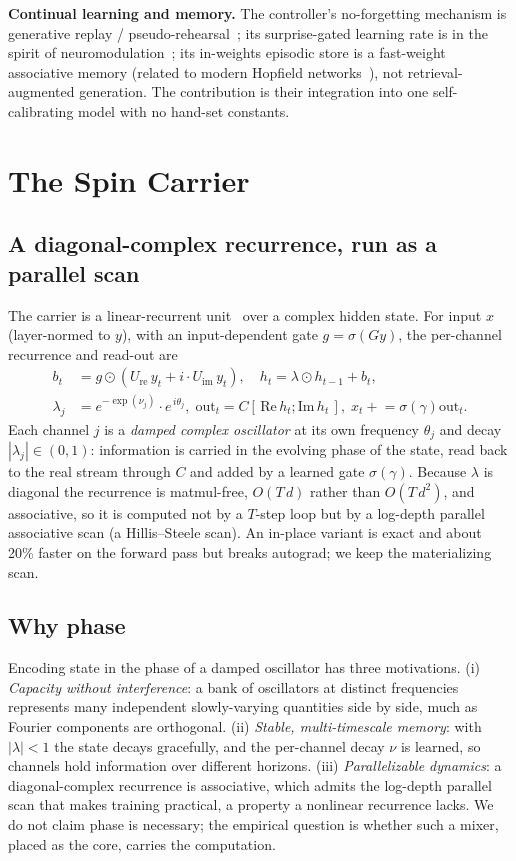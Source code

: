 \documentclass[journal]{IEEEtran}
\begin{document}
\textbf{Continual learning and memory.} The controller's no-forgetting mechanism is generative replay / pseudo-rehearsal~\cite{robins1995}; its surprise-gated learning rate is in the spirit of neuromodulation~\cite{doya2002}; its in-weights episodic store is a fast-weight associative memory (related to modern Hopfield networks~\cite{ramsauer2021}), not retrieval-augmented generation. The contribution is their integration into one self-calibrating model with no hand-set constants.

\section{The Spin Carrier}
\label{sec:carrier}
\subsection{A diagonal-complex recurrence, run as a parallel scan}
The carrier is a linear-recurrent unit~\cite{gu2022s4} over a complex hidden state. For input $x$ (layer-normed to $y$), with an input-dependent gate $g=\sigma(G y)$, the per-channel recurrence and read-out are
\begin{align}
b_t &= g \odot (U_{\mathrm{re}}\, y_t + i \cdot U_{\mathrm{im}}\, y_t), \quad h_t = \lambda \odot h_{t-1} + b_t, \\
\lambda_j &= e^{-\exp(\nu_j)} \cdot e^{\,i\theta_j}, \; \mathrm{out}_t = C[\,\mathrm{Re}\, h_t ; \mathrm{Im}\, h_t\,], \; x_t \mathrel{+}= \sigma(\gamma) \mathrm{out}_t. \nonumber
\end{align}
Each channel $j$ is a \emph{damped complex oscillator} at its own frequency $\theta_j$ and decay $|\lambda_j|\in(0,1)$: information is carried in the evolving phase of the state, read back to the real stream through $C$ and added by a learned gate $\sigma(\gamma)$. Because $\lambda$ is diagonal the recurrence is matmul-free, $O(T\,d)$ rather than $O(T\,d^2)$, and associative, so it is computed not by a $T$-step loop but by a log-depth parallel associative scan (a Hillis--Steele scan). An in-place variant is exact and about 20\% faster on the forward pass but breaks autograd; we keep the materializing scan.

\subsection{Why phase}
Encoding state in the phase of a damped oscillator has three motivations. (i) \emph{Capacity without interference}: a bank of oscillators at distinct frequencies represents many independent slowly-varying quantities side by side, much as Fourier components are orthogonal. (ii) \emph{Stable, multi-timescale memory}: with $|\lambda|<1$ the state decays gracefully, and the per-channel decay $\nu$ is learned, so channels hold information over different horizons. (iii) \emph{Parallelizable dynamics}: a diagonal-complex recurrence is associative, which admits the log-depth parallel scan that makes training practical, a property a nonlinear recurrence lacks. We do not claim phase is necessary; the empirical question is whether such a mixer, placed as the core, carries the computation.
\end{document}
